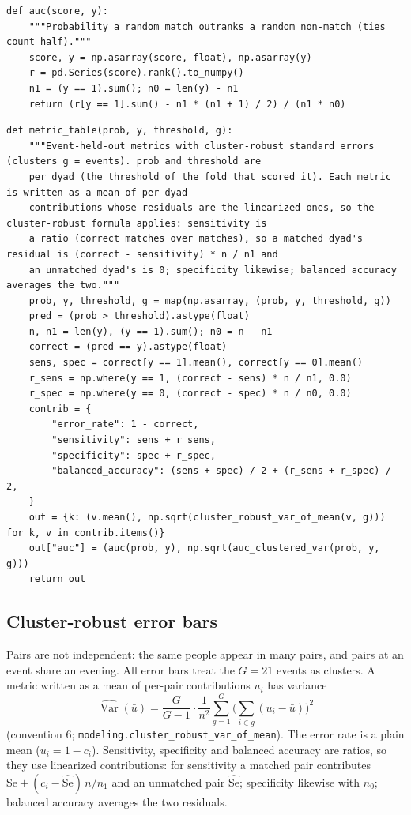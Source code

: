 \documentclass[11pt]{article}
\begin{document}
\begin{lstlisting}[caption={AUC from ranks (scripts/modeling.py)}]
def auc(score, y):
    """Probability a random match outranks a random non-match (ties count half)."""
    score, y = np.asarray(score, float), np.asarray(y)
    r = pd.Series(score).rank().to_numpy()
    n1 = (y == 1).sum(); n0 = len(y) - n1
    return (r[y == 1].sum() - n1 * (n1 + 1) / 2) / (n1 * n0)
\end{lstlisting}

\begin{lstlisting}[caption={The metric table with its error bars (scripts/modeling.py)}]
def metric_table(prob, y, threshold, g):
    """Event-held-out metrics with cluster-robust standard errors (clusters g = events). prob and threshold are
    per dyad (the threshold of the fold that scored it). Each metric is written as a mean of per-dyad
    contributions whose residuals are the linearized ones, so the cluster-robust formula applies: sensitivity is
    a ratio (correct matches over matches), so a matched dyad's residual is (correct - sensitivity) * n / n1 and
    an unmatched dyad's is 0; specificity likewise; balanced accuracy averages the two."""
    prob, y, threshold, g = map(np.asarray, (prob, y, threshold, g))
    pred = (prob > threshold).astype(float)
    n, n1 = len(y), (y == 1).sum(); n0 = n - n1
    correct = (pred == y).astype(float)
    sens, spec = correct[y == 1].mean(), correct[y == 0].mean()
    r_sens = np.where(y == 1, (correct - sens) * n / n1, 0.0)
    r_spec = np.where(y == 0, (correct - spec) * n / n0, 0.0)
    contrib = {
        "error_rate": 1 - correct,
        "sensitivity": sens + r_sens,
        "specificity": spec + r_spec,
        "balanced_accuracy": (sens + spec) / 2 + (r_sens + r_spec) / 2,
    }
    out = {k: (v.mean(), np.sqrt(cluster_robust_var_of_mean(v, g))) for k, v in contrib.items()}
    out["auc"] = (auc(prob, y), np.sqrt(auc_clustered_var(prob, y, g)))
    return out
\end{lstlisting}

\subsection{Cluster-robust error bars}

Pairs are not independent: the same people appear in many pairs, and pairs at an event share an evening. All
error bars treat the $G = 21$ events as clusters. A metric written as a mean of per-pair contributions
$u_i$ has variance
\[
\widehat{\operatorname{Var}}(\bar u) = \frac{G}{G-1}\cdot\frac{1}{n^2}\sum_{g=1}^{G}\Big(\sum_{i \in g}(u_i - \bar u)\Big)^2
\]
(convention 6; \texttt{modeling.cluster\_robust\_var\_of\_mean}). The error rate is a plain mean ($u_i = 1 - c_i$).
Sensitivity, specificity and balanced accuracy are ratios, so they use linearized contributions: for sensitivity a
matched pair contributes $\widehat{\text{Se}} + (c_i - \widehat{\text{Se}})\,n/n_1$ and an unmatched pair
$\widehat{\text{Se}}$; specificity likewise with $n_0$; balanced accuracy averages the two residuals.
\end{document}
